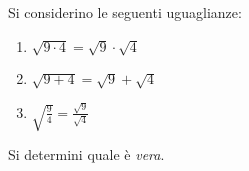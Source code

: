 Si considerino le seguenti uguaglianze: 
\begin{enumerate}
	\item
	$\sqrt{9 \cdot 4} = \sqrt{9} \cdot \sqrt{4}$
	\item
	$\sqrt{9 + 4} = \sqrt{9} + \sqrt{4}$
	\item
	$\sqrt{\frac{9}{4}} = \frac{\sqrt{9}}{\sqrt{4}}$ 
\end{enumerate}
Si determini quale è \emph{vera}.